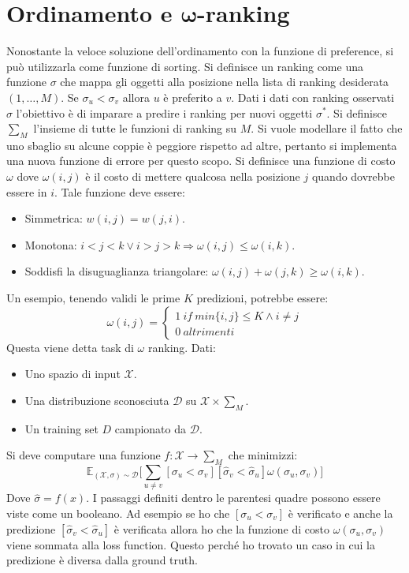 \section{Ordinamento e $\mathbf{\omega}$-ranking}
Nonostante la veloce soluzione dell'ordinamento con la funzione di preference, si pu\`o utilizzarla come funzione di sorting.
Si definisce un ranking come una funzione $\sigma$ che mappa gli oggetti alla posizione nella lista di ranking desiderata $(1,\dots,M)$.
Se $\sigma_u < \sigma_v$ allora $u$ \`e preferito a $v$.
Dati i dati con ranking osservati $\sigma$ l'obiettivo \`e di imparare a predire i ranking per nuovi oggetti $\sigma^*$.
Si definisce $\sum_M$ l'insieme di tutte le funzioni di ranking su $M$.
Si vuole modellare il fatto che uno sbaglio su alcune coppie \`e peggiore rispetto ad altre, pertanto si implementa una nuova funzione di errore per questo scopo.
Si definisce una funzione di costo $\omega$ dove $\omega(i,j)$ \`e il costo di mettere qualcosa nella posizione $j$ quando dovrebbe essere in $i$.
Tale funzione deve essere:
\begin{multicols}{2}
	\begin{itemize}
		\item Simmetrica: $w(i,j) = w(j,i)$.
		\item Monotona: $i<j<k\lor i>j>k \Rightarrow \omega(i,j) \le \omega(i,k)$.
		\item Soddisfi la disuguaglianza triangolare: $\omega(i,j)+\omega(j,k) \ge \omega(i,k)$.
	\end{itemize}
\end{multicols}
Un esempio, tenendo validi le prime $K$ predizioni, potrebbe essere:
$$\omega(i,j) = \begin{cases}1\ if\ min\{i,j\} \le K \land i\neq j\\ 0\ altrimenti\end{cases}$$
Questa viene detta task di $\omega$ ranking.
Dati:
\begin{itemize}
	\item Uno spazio di input $\mathcal{X}$.
	\item Una distribuzione sconosciuta $\mathcal{D}$ su $\mathcal{X}\times\sum_M$.
	\item Un training set $D$ campionato da $\mathcal{D}$.
\end{itemize}
Si deve computare una funzione $f:\mathcal{X}\rightarrow\sum_M$ che minimizzi:
$$\mathbb{E}_{(\mathcal{X},\sigma)\sim\mathcal{D}}\biggl[\sum\limits_{u\neq v}[\sigma_u < \sigma_v][\hat{\sigma}_v < \hat{\sigma}_u]\omega(\sigma_u,\sigma_v)\biggr]$$
Dove $\hat{\sigma} = f(x)$. I passaggi definiti dentro le parentesi quadre possono essere viste come un booleano. Ad esempio se ho che $[\sigma_u < \sigma_v]$
è verificato e anche la predizione $[\hat{\sigma}_v < \hat{\sigma}_u]$ è verificata allora ho che la funzione di costo $\omega(\sigma_u,\sigma_v)$ viene sommata alla loss function. 
Questo perché ho trovato un caso in cui la predizione è diversa dalla ground truth.

